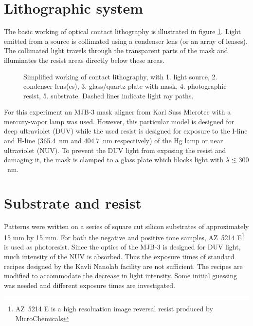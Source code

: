 \section*{Lithographic system}
The basic working of optical contact lithography is illustrated in figure \ref{fig:contact-litho}. Light emitted from a source is collimated using a condenser lens (or an array of lenses). The collimated light travels through the transparent parts of the mask and illuminates the resist areas directly below these areas. 
\begin{figure}[H]
	\centering
	\resizebox{0.7\linewidth}{!}{}
	\caption{Simplified working of contact lithography, with 1. light source, 2. condenser lens(es), 3. glass/quartz plate with mask, 4. photographic resist, 5. substrate. Dashed lines indicate light ray paths.}
	\label{fig:contact-litho}
\end{figure} For this experiment an MJB-3 mask aligner from Karl Suss Microtec with a mercury-vapor lamp was used. However, this particular model is designed for deep ultraviolet (DUV) while the used resist is designed for exposure to the I-line and H-line (365.4~nm and 404.7~nm respectively) of the Hg lamp or near ultraviolet (NUV). To prevent the DUV light from exposing the resist and damaging it, the mask is clamped to a glass plate which blocks light with $\lambda \lesssim 300$~nm.


\section*{Substrate and resist}
Patterns were written on a series of square cut silicon substrates of approximately 15 mm by 15 mm. For both the negative and positive tone samples, AZ~5214 E\footnote{AZ~5214 E is a high resoluation image reversal resist produced by MicroChemicals} is used as photoresist. Since the optics of the MJB-3 is designed for DUV light, much intensity of the NUV is absorbed. Thus the exposure times of standard recipes designed by the Kavli Nanolab facility are not sufficient. The recipes are modified to accommodate the decrease in light intensity. Some initial guessing was needed and different exposure times are  investigated.

